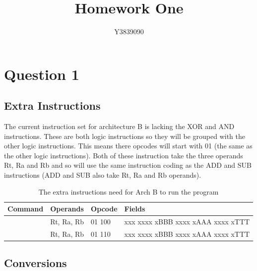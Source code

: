 \documentclass[10pt]{article}
\title{Homework One}
\author{Y3839090}
\begin{document}
    
	\maketitle
	
	\tableofcontents %
	\listoffigures %
	\newpage

	\section{Question 1}
		\subsection{Extra Instructions}
        
        The current instruction set for architecture B is lacking the XOR and AND instructions. These are both logic instructions so they will be grouped with the other logic instructions. This means there opcodes will start with 01 (the same as the other logic instructions). Both of these instruction take the three operands Rt, Ra and Rb and so will use the same instruction coding as the ADD and SUB instructions (ADD and SUB also take Rt, Ra and Rb operands).
        
\begin{table}[ht]
\centering
\caption{The extra instructions need for Arch B to run the program}
\label{table:extrainstructions}
\begin{tabular}{l|lll}
\rowcolor[HTML]{417CB4} 
{\color[HTML]{FFFFFF} \textbf{Command}} & {\color[HTML]{FFFFFF} \textbf{Operands}} & {\color[HTML]{FFFFFF} \textbf{Opcode}} & {\color[HTML]{FFFFFF} \textbf{Fields}} \\ \hline
\rowcolor[HTML]{C4D9E1} 
\cellcolor[HTML]{417CB4}{\color[HTML]{FFFFFF} and} & Rt, Ra, Rb & 01 100 & xxx xxxx xBBB xxxx xAAA xxxx xTTT \\
\rowcolor[HTML]{DBE5E8} 
\cellcolor[HTML]{417CB4}{\color[HTML]{FFFFFF} xor} & Rt, Ra, Rb & 01 110 & xxx xxxx xBBB xxxx xAAA xxxx xTTT
\end{tabular}
\end{table}

		\subsection{Conversions}
        
\end{document}
